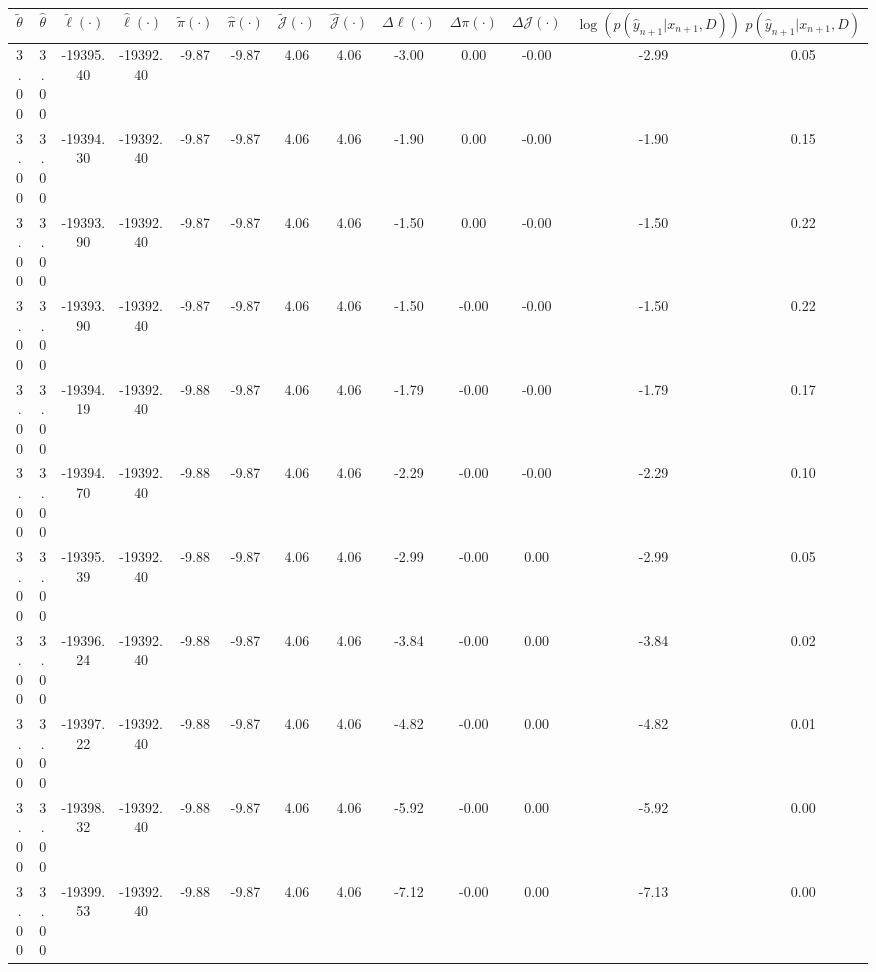 \begin{table}[htbp]
        \centering
        \tiny
        \begin{adjustbox}{angle=90}
            \begin{tabular}{|c|c|c|c|c|c|c|c|c|c|c|c|c|}
                \hline
                 $\tilde{\theta}$ & $\hat{\theta}$ & $\tilde{\ell}(\cdot)$ & $\hat{\ell}(\cdot)$ & $\tilde{\pi}(\cdot)$ & $\hat{\pi}(\cdot)$ & $\tilde{\mathcal{J}}(\cdot)$ & $\hat{\mathcal{J}}(\cdot)$ & $\Delta \ell(\cdot)$ & $\Delta \pi(\cdot)$ & $\Delta \mathcal{J}(\cdot)$ & $\log(p(\hat{y}_{n+1}|x_{n+1}, D))$ & $p(\hat{y}_{n+1}|x_{n+1}, D)$ \\
                \hline
                 3.00 & 3.00 & -19395.40 & -19392.40 & -9.87 & -9.87 & 4.06 & 4.06 & -3.00 & 0.00 & -0.00 & -2.99 & 0.05\\ \hline
 3.00 & 3.00 & -19394.30 & -19392.40 & -9.87 & -9.87 & 4.06 & 4.06 & -1.90 & 0.00 & -0.00 & -1.90 & 0.15\\ \hline
 3.00 & 3.00 & -19393.90 & -19392.40 & -9.87 & -9.87 & 4.06 & 4.06 & -1.50 & 0.00 & -0.00 & -1.50 & 0.22\\ \hline
 3.00 & 3.00 & -19393.90 & -19392.40 & -9.87 & -9.87 & 4.06 & 4.06 & -1.50 & -0.00 & -0.00 & -1.50 & 0.22\\ \hline
 3.00 & 3.00 & -19394.19 & -19392.40 & -9.88 & -9.87 & 4.06 & 4.06 & -1.79 & -0.00 & -0.00 & -1.79 & 0.17\\ \hline
 3.00 & 3.00 & -19394.70 & -19392.40 & -9.88 & -9.87 & 4.06 & 4.06 & -2.29 & -0.00 & -0.00 & -2.29 & 0.10\\ \hline
 3.00 & 3.00 & -19395.39 & -19392.40 & -9.88 & -9.87 & 4.06 & 4.06 & -2.99 & -0.00 & 0.00 & -2.99 & 0.05\\ \hline
 3.00 & 3.00 & -19396.24 & -19392.40 & -9.88 & -9.87 & 4.06 & 4.06 & -3.84 & -0.00 & 0.00 & -3.84 & 0.02\\ \hline
 3.00 & 3.00 & -19397.22 & -19392.40 & -9.88 & -9.87 & 4.06 & 4.06 & -4.82 & -0.00 & 0.00 & -4.82 & 0.01\\ \hline
 3.00 & 3.00 & -19398.32 & -19392.40 & -9.88 & -9.87 & 4.06 & 4.06 & -5.92 & -0.00 & 0.00 & -5.92 & 0.00\\ \hline
 3.00 & 3.00 & -19399.53 & -19392.40 & -9.88 & -9.87 & 4.06 & 4.06 & -7.12 & -0.00 & 0.00 & -7.13 & 0.00\\ \hline
            \end{tabular}
        \end{adjustbox}
        \caption{}
        \label{}
    \end{table}
    